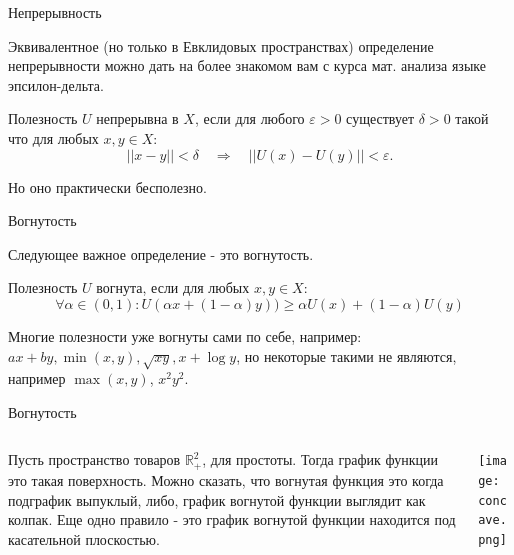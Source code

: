 \documentclass{beamer}
\begin{document}
\begin{frame}{Непрерывность}

Эквивалентное (но только в Евклидовых пространствах) определение непрерывности можно дать на более знакомом вам с курса мат. анализа языке эпсилон-дельта.

\begin{definition} Полезность $U$ \alert{непрерывна} в $X$, если для любого $\varepsilon > 0$ существует $\delta >0$ такой что для любых $x, y \in X$: $$ ||x - y|| < \delta \quad \Rightarrow \quad ||U(x) - U(y)|| < \varepsilon.$$	
\end{definition}

Но оно практически бесполезно.

\end{frame}

\begin{frame}{Вогнутость}

Следующее важное определение - это вогнутость.

\begin{definition}
Полезность $U$ \alert{вогнута}, если для любых $x, y \in X$: 
$$ \forall \alpha \in (0,1): U(\alpha x + (1-\alpha) y)) \geqslant \alpha U(x) + (1-\alpha) U(y)$$
\end{definition}

Многие полезности уже вогнуты сами по себе, например: $ax + by, \min(x,y), \sqrt{xy}, x + \log y$, но некоторые такими не являются, например $\max(x,y)$, $x^2y^2$.

\end{frame}

\begin{frame}{Вогнутость}

\begin{columns}
\begin{column}{0.5\textwidth}
   Пусть пространство товаров $\mathbb{R}^{2}_+$, для простоты. Тогда график функции это такая поверхность. Можно сказать, что \alert{вогнутая функция это когда подграфик выпуклый}, либо, \alert{график вогнутой функции выглядит как колпак}. Еще одно правило - это \alert{график вогнутой функции находится под касательной плоскостью.}\end{column}
\begin{column}{0.5\textwidth}  %
    \begin{center}
     \texttt{[image: concave.png]}
     \end{center}
\end{column}
\end{columns}

\end{frame}
\end{document}
